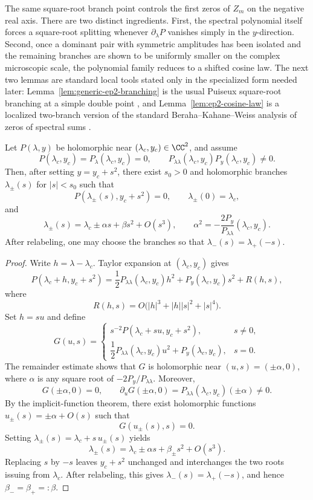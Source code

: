 The same square-root branch point controls the first zeros of \(Z_m\) on the negative real axis.
There are two distinct ingredients.
First, the spectral polynomial itself forces a square-root splitting whenever \(\partial_\lambda P\) vanishes simply in the \(y\)-direction.
Second, once a dominant pair with symmetric amplitudes has been isolated and the remaining branches are shown to be uniformly smaller on the complex microscopic scale, the polynomial family reduces to a shifted cosine law.
The next two lemmas are standard local tools stated only in the specialized form needed later:
Lemma~\ref{lem:generic-ep2-branching} is the usual Puiseux square-root branching at a simple double point \cite{Walker1950,BrieskornKnorrer1986}, and Lemma~\ref{lem:ep2-cosine-law} is a localized two-branch version of the standard Beraha--Kahane--Weiss analysis of zeros of spectral sums \cite{BerahaKahaneWeiss1975,BerahaKahaneWeiss1978,Sokal2004}.

\begin{lemma}\label{lem:generic-ep2-branching}
Let \(P(\lambda,y)\) be holomorphic near \((\lambda_c,y_c)\in\CC^2\), and assume
\[
P(\lambda_c,y_c)=P_\lambda(\lambda_c,y_c)=0,
\qquad
P_{\lambda\lambda}(\lambda_c,y_c)P_y(\lambda_c,y_c)\neq 0.
\]
Then, after setting \(y=y_c+s^2\), there exist \(s_0>0\) and holomorphic branches \(\lambda_\pm(s)\) for \(|s|<s_0\) such that
\[
P(\lambda_\pm(s),y_c+s^2)=0,
\qquad
\lambda_\pm(0)=\lambda_c,
\]
and
\[
\lambda_\pm(s)=\lambda_c\pm \alpha s+\beta s^2+O(s^3),
\qquad
\alpha^2=-\frac{2P_y}{P_{\lambda\lambda}}(\lambda_c,y_c).
\]
After relabeling, one may choose the branches so that \(\lambda_-(s)=\lambda_+(-s)\).
\end{lemma}

\begin{proof}
Write \(h=\lambda-\lambda_c\).
Taylor expansion at \((\lambda_c,y_c)\) gives
\[
P(\lambda_c+h,y_c+s^2)
=
\frac{1}{2}P_{\lambda\lambda}(\lambda_c,y_c)h^2
+P_y(\lambda_c,y_c)s^2
+R(h,s),
\]
where
\[
R(h,s)=O\!\bigl(|h|^3+|h||s|^2+|s|^4\bigr).
\]
Set \(h=su\) and define
\[
G(u,s)=
\begin{cases}
s^{-2}P(\lambda_c+su,y_c+s^2), & s\neq 0,\\[4pt]
\dfrac{1}{2}P_{\lambda\lambda}(\lambda_c,y_c)u^2+P_y(\lambda_c,y_c), & s=0.
\end{cases}
\]
The remainder estimate shows that \(G\) is holomorphic near \((u,s)=(\pm\alpha,0)\), where \(\alpha\) is any square root of \(-2P_y/P_{\lambda\lambda}\).
Moreover,
\[
G(\pm\alpha,0)=0,
\qquad
\partial_u G(\pm\alpha,0)=P_{\lambda\lambda}(\lambda_c,y_c)(\pm\alpha)\neq 0.
\]
By the implicit-function theorem, there exist holomorphic functions \(u_\pm(s)=\pm\alpha+O(s)\) such that
\[
G(u_\pm(s),s)=0.
\]
Setting \(\lambda_\pm(s)=\lambda_c+s\,u_\pm(s)\) yields
\[
\lambda_\pm(s)=\lambda_c\pm\alpha s+\beta_\pm s^2+O(s^3).
\]
Replacing \(s\) by \(-s\) leaves \(y_c+s^2\) unchanged and interchanges the two roots issuing from \(\lambda_c\).
After relabeling, this gives \(\lambda_-(s)=\lambda_+(-s)\), and hence \(\beta_-=\beta_+=:\beta\).
\end{proof}

